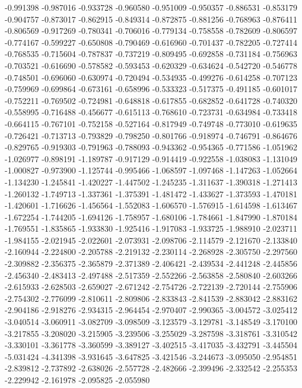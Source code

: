 -0.991398
-0.987016
-0.933728
-0.960580
-0.951009
-0.950357
-0.886531
-0.853179
-0.904757
-0.873017
-0.862915
-0.849314
-0.872875
-0.881256
-0.768963
-0.876411
-0.806569
-0.917269
-0.780341
-0.706016
-0.779134
-0.758558
-0.782609
-0.806597
-0.774167
-0.599227
-0.650808
-0.790469
-0.616960
-0.701437
-0.782205
-0.727414
-0.768535
-0.715604
-0.787837
-0.737219
-0.809495
-0.692858
-0.731184
-0.756963
-0.703521
-0.616690
-0.578582
-0.593453
-0.620329
-0.634624
-0.542720
-0.546778
-0.748501
-0.696060
-0.630974
-0.720494
-0.534935
-0.499276
-0.614258
-0.707123
-0.759969
-0.699864
-0.673161
-0.658996
-0.533323
-0.517375
-0.491185
-0.601017
-0.752211
-0.769502
-0.724981
-0.648818
-0.617855
-0.682852
-0.641728
-0.740320
-0.558995
-0.716488
-0.456677
-0.615113
-0.768610
-0.723731
-0.634984
-0.733418
-0.664115
-0.767101
-0.752158
-0.527164
-0.817949
-0.749748
-0.773010
-0.619635
-0.726421
-0.713713
-0.793829
-0.798250
-0.801766
-0.918974
-0.746791
-0.864676
-0.829765
-0.919303
-0.791963
-0.788093
-0.943362
-0.954365
-0.771586
-1.051962
-1.026977
-0.898191
-1.189787
-0.917129
-0.914419
-0.922558
-1.038083
-1.131049
-1.000827
-0.973900
-1.125744
-0.995466
-1.068597
-1.097468
-1.147263
-1.052664
-1.134230
-1.245841
-1.420227
-1.447502
-1.245235
-1.311637
-1.390318
-1.271413
-1.260132
-1.749713
-1.337361
-1.375391
-1.481472
-1.433627
-1.373593
-1.470181
-1.420601
-1.716626
-1.456564
-1.552083
-1.606570
-1.576915
-1.614598
-1.613467
-1.672254
-1.744205
-1.694126
-1.758957
-1.680106
-1.784661
-1.847990
-1.870184
-1.769551
-1.835865
-1.933830
-1.925416
-1.917083
-1.933725
-1.988910
-2.023711
-1.984155
-2.021945
-2.022601
-2.073931
-2.098706
-2.114579
-2.121670
-2.133840
-2.160944
-2.224800
-2.205788
-2.219132
-2.230114
-2.268928
-2.305750
-2.297560
-2.309882
-2.356375
-2.365879
-2.371389
-2.406421
-2.439534
-2.441248
-2.445856
-2.456340
-2.483413
-2.497488
-2.517359
-2.552266
-2.563858
-2.580840
-2.603266
-2.615933
-2.628503
-2.659027
-2.671242
-2.754726
-2.722139
-2.720144
-2.755906
-2.754302
-2.776099
-2.810611
-2.809806
-2.833843
-2.841539
-2.883042
-2.883162
-2.904186
-2.918276
-2.934315
-2.964454
-2.970407
-2.990365
-3.004572
-3.025412
-3.040514
-3.060911
-3.082709
-3.098509
-3.123579
-3.129781
-3.148549
-3.170100
-3.217855
-3.208020
-3.215905
-3.239506
-3.255029
-3.287598
-3.318761
-3.310542
-3.330101
-3.361778
-3.360599
-3.389127
-3.402515
-3.417035
-3.432791
-3.445504
-5.031424
-4.341398
-3.931645
-3.647825
-3.421546
-3.244673
-3.095050
-2.954851
-2.839812
-2.737892
-2.638026
-2.557728
-2.482666
-2.399496
-2.332542
-2.255353
-2.229942
-2.161978
-2.095825
-2.055980
